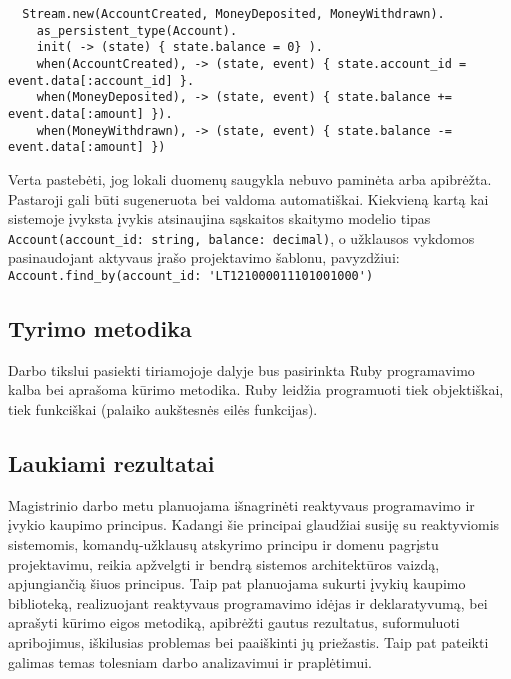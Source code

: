 \begin{lstlisting}
  Stream.new(AccountCreated, MoneyDeposited, MoneyWithdrawn).
    as_persistent_type(Account).
    init( -> (state) { state.balance = 0} ).
    when(AccountCreated), -> (state, event) { state.account_id = event.data[:account_id] }.
    when(MoneyDeposited), -> (state, event) { state.balance += event.data[:amount] }).
    when(MoneyWithdrawn), -> (state, event) { state.balance -= event.data[:amount] })
\end{lstlisting}

Verta pastebėti, jog lokali duomenų saugykla nebuvo paminėta arba apibrėžta. Pastaroji gali būti sugeneruota bei valdoma automatiškai. Kiekvieną kartą kai sistemoje įvyksta įvykis atsinaujina sąskaitos skaitymo modelio tipas \lstinline|Account(account_id: string, balance: decimal)|, o užklausos vykdomos pasinaudojant aktyvaus įrašo projektavimo šablonu, pavyzdžiui: \lstinline|Account.find_by(account_id: 'LT121000011101001000')|

\subsection{Tyrimo metodika}

    Darbo tikslui pasiekti tiriamojoje dalyje bus pasirinkta Ruby programavimo kalba bei aprašoma kūrimo metodika. Ruby leidžia programuoti tiek objektiškai, tiek funkciškai (palaiko aukštesnės eilės funkcijas).

\subsection{Laukiami rezultatai}

    Magistrinio darbo metu planuojama išnagrinėti reaktyvaus programavimo ir įvykio kaupimo principus. Kadangi šie principai glaudžiai susiję su reaktyviomis sistemomis, komandų-užklausų atskyrimo principu ir domenu pagrįstu projektavimu, reikia apžvelgti ir bendrą sistemos architektūros vaizdą, apjungiančią šiuos principus. Taip pat planuojama sukurti įvykių kaupimo biblioteką, realizuojant reaktyvaus programavimo idėjas ir deklaratyvumą, bei aprašyti kūrimo eigos metodiką, apibrėžti gautus rezultatus, suformuluoti apribojimus, iškilusias problemas bei paaiškinti jų priežastis. Taip pat pateikti galimas temas tolesniam darbo analizavimui ir praplėtimui.
